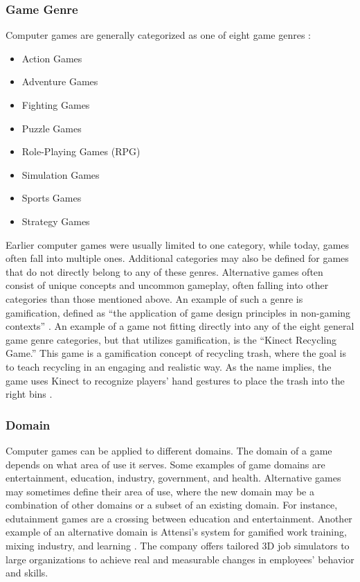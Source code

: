 \documentclass[../Main.tex]{subfiles}
\begin{document}
\subsubsection{Game Genre}
Computer games are generally categorized as one of eight game genres \citep{prensky_fun_2001}:

\begin{itemize}
    \item Action Games
    \item Adventure Games
    \item Fighting Games
    \item Puzzle Games
    \item Role-Playing Games (RPG)
    \item Simulation Games
    \item Sports Games
    \item Strategy Games
\end{itemize}

Earlier computer games were usually limited to one category, while today, games often fall into multiple ones. Additional categories may also be defined for games that do not directly belong to any of these genres. Alternative games often consist of unique concepts and uncommon gameplay, often falling into other categories than those mentioned above. An example of such a genre is gamification, defined as “the application of game design principles in non-gaming contexts” \cite{robson_is_2015}. An example of a game not fitting directly into any of the eight general game genre categories, but that utilizes gamification, is the “Kinect Recycling Game.” This game is a gamification concept of recycling trash, where the goal is to teach recycling in an engaging and realistic way. As the name implies, the game uses Kinect to recognize players' hand gestures to place the trash into the right bins \citep{wang_learning_2015}.

\subsubsection{Domain}
Computer games can be applied to different domains. The domain of a game depends on what area of use it serves. Some examples of game domains are entertainment, education, industry, government, and health. Alternative games may sometimes define their area of use, where the new domain may be a combination of other domains or a subset of an existing domain. For instance, edutainment games are a crossing between education and entertainment. Another example of an alternative domain is Attensi’s system for gamified work training, mixing industry, and learning \citep{attensi_why_2020}. The company offers tailored 3D job simulators to large organizations to achieve real and measurable changes in employees’ behavior and skills.  
\end{document}
